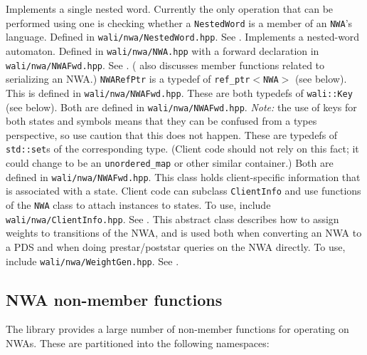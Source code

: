 \begin{functionlist}
   Implements a single nested word. Currently the only
    operation that can be performed using one is checking whether a
    \texttt{NestedWord} is a member of an \texttt{NWA}'s language. Defined in
    \texttt{wali/nwa/NestedWord.hpp}. See .
   Implements a nested-word automaton. Defined in
    \texttt{wali/nwa/NWA.hpp} with a forward declaration in \texttt{wali/nwa/NWAFwd.hpp}.
    See
    . ( also discusses member
    functions related to serializing an NWA.)
   \texttt{NWARefPtr} is a typedef of \texttt{ref\_ptr$<$NWA$>$} (see
    below). This is defined in \texttt{wali/nwa/NWAFwd.hpp}.
   These are both typedefs of
    \texttt{wali::Key} (see below). Both are defined in
    \texttt{wali/nwa/NWAFwd.hpp}. \emph{Note:} the use of keys for both
    states and symbols means that they can be confused from a types
    perspective, so use caution that this does not happen. 
   These are typedefs of
    \texttt{std::set}s of the corresponding type. (Client code should not
    rely on this
    fact; it could change to be an \texttt{unordered\_map} or other similar
    container.) Both are defined in \texttt{wali/nwa/NWAFwd.hpp}.
   This class holds client-specific information that
    is associated with a state. Client code can subclass \texttt{ClientInfo} and use
    functions of the \texttt{NWA} class to attach instances to states. To use,
    include \texttt{wali/nwa/ClientInfo.hpp}. See .
   This abstract class describes how to assign weights
    to transitions of the NWA, and is used both when converting an NWA to a
    PDS and when doing prestar/poststar queries on the NWA directly. To use,
    include \texttt{wali/nwa/WeightGen.hpp}. See .
\end{functionlist}


\subsection{NWA non-member functions}

The library provides a large number of non-member functions for operating on
NWAs. These are partitioned into the following namespaces:

